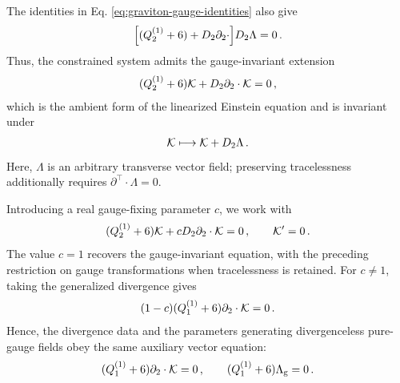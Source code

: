 \documentclass{SciPost}
\begin{document}
The identities in Eq. \eqref{eq:graviton-gauge-identities} also give
\begin{align}
    \Bigl[
        (Q^{(1)}_2+6)+D_2\partial_2\cdot
    \Bigr]D_2\Lambda=0 \,.
\end{align}
Thus, the constrained system admits the gauge-invariant extension
\begin{align}\label{eq:graviton-field-equation}
    (Q^{(1)}_2+6){\cal K}
    +D_2\partial_2\cdot{\cal K}=0 \,,
\end{align}
which is the ambient form of the linearized Einstein equation and is invariant under
\begin{align}\label{eq:graviton-ordinary-gauge}
    {\cal K}\longmapsto{\cal K}+D_2\Lambda \,.
\end{align}
Here, $\Lambda$ is an arbitrary transverse vector field; preserving tracelessness additionally requires $\partial^{\top}\cdot\Lambda=0$.

Introducing a real gauge-fixing parameter $c$, we work with
\begin{align}\label{eq:graviton-c-equation}
    (Q^{(1)}_2+6){\cal K}
    +cD_2\partial_2\cdot{\cal K}=0 \,,
    \qquad
    {\cal K}^{\prime}=0 \,.
\end{align}
The value $c=1$ recovers the gauge-invariant equation, with the preceding restriction on gauge transformations when tracelessness is retained. For $c\neq1$, taking the generalized divergence gives
\begin{align}
    (1-c)(Q^{(1)}_1+6)\partial_2\cdot{\cal K}=0 \,.
\end{align}
Hence, the divergence data and the parameters generating divergenceless pure-gauge fields obey the same auxiliary vector equation:
\begin{align}\label{eq:graviton-auxiliary-sectors}
    (Q^{(1)}_1+6)\partial_2\cdot{\cal K}=0 \,,
    \qquad
    (Q^{(1)}_1+6)\Lambda_{\rm g}=0 \,.
\end{align}
\end{document}
